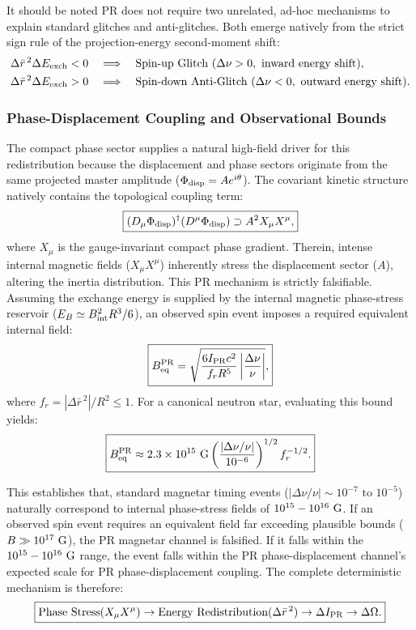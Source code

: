 \documentclass[11pt]{article}
\begin{document}
It should be noted PR does not require two unrelated, ad-hoc mechanisms to explain standard glitches and anti-glitches. Both emerge natively from the strict sign rule of the projection-energy second-moment shift:
\begin{align}
\Delta\bar r^{\,2}\Delta E_{\rm exch}<0
\quad
&\Longrightarrow
\quad
\text{Spin-up Glitch } (\Delta\nu>0, \text{ inward energy shift}),
\\
\Delta\bar r^{\,2}\Delta E_{\rm exch}>0
\quad
&\Longrightarrow
\quad
\text{Spin-down Anti-Glitch } (\Delta\nu<0, \text{ outward energy shift}).
\end{align}

\subsubsection{Phase-Displacement Coupling and Observational Bounds}
The compact phase sector supplies a natural high-field driver for this redistribution because the displacement and phase sectors originate from the same projected master amplitude ($\Phi_{\rm disp} = A e^{i\theta}$). The covariant kinetic structure natively contains the topological coupling term:
\begin{equation}
\boxed{
(D_\mu\Phi_{\rm disp})^\dagger
(D^\mu\Phi_{\rm disp})
\supset
A^2X_\mu X^\mu,
}
\end{equation}
where $X_\mu$ is the gauge-invariant compact phase gradient. Therein, intense internal magnetic fields ($X_\mu X^\mu$) inherently stress the displacement sector ($A$), altering the inertia distribution. This PR mechanism is strictly falsifiable. Assuming the exchange energy is supplied by the internal magnetic phase-stress reservoir ($E_B \simeq B_{\rm int}^2R^3/6$), an observed spin event imposes a required equivalent internal field:
\begin{equation}
\boxed{
B_{\rm eq}^{\rm PR}
=
\sqrt{
\frac{
6I_{\rm PR}c^2
}{
f_rR^5
}
\left|
\frac{\Delta\nu}{\nu}
\right|
},
}
\end{equation}
where $f_r = |\Delta\bar r^{\,2}|/R^2 \le 1$. For a canonical neutron star, evaluating this bound yields:
\begin{equation}
\boxed{
B_{\rm eq}^{\rm PR}
\approx
2.3\times10^{15}\ {\rm G}
\left(
\frac{|\Delta\nu/\nu|}{10^{-6}}
\right)^{1/2}
f_r^{-1/2}.
}
\end{equation}

This establishes that, standard magnetar timing events ($|\Delta\nu/\nu| \sim 10^{-7} \text{ to } 10^{-5}$) naturally correspond to internal phase-stress fields of $10^{15} - 10^{16}\ {\rm G}$. If an observed spin event requires an equivalent field far exceeding plausible bounds ($B \gg 10^{17}\ {\rm G}$), the PR magnetar channel is falsified. If it falls within the $10^{15} - 10^{16}\ {\rm G}$ range, the event falls within the PR phase-displacement channel's expected scale for PR phase-displacement coupling. The complete deterministic mechanism is therefore:
\begin{equation}
\boxed{
\text{Phase Stress} (X_\mu X^\mu) \rightarrow \text{Energy Redistribution} (\Delta\bar r^{\,2}) \rightarrow \Delta I_{\rm PR} \rightarrow \Delta\Omega.
}
\end{equation}
\end{document}
